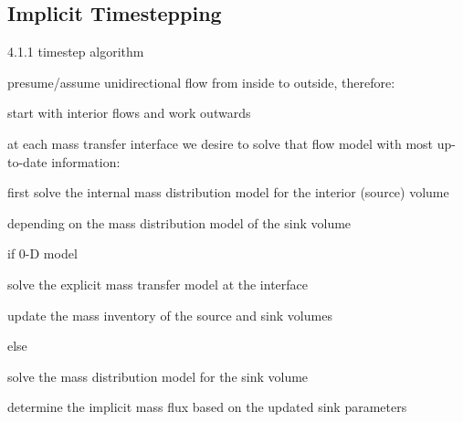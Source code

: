 \subsection{Implicit Timestepping}\label{sec:timestepping}

4.1.1 timestep algorithm

presume/assume unidirectional flow from inside to outside, therefore:

start with interior flows and work outwards

at each mass transfer interface we desire to solve that flow model with most up-to-date information:

first solve the internal mass distribution model for the interior (source) volume

depending on the mass distribution model of the sink volume

if 0-D model

solve the explicit mass transfer model at the interface

update the mass inventory of the source and sink volumes


else

solve the mass distribution model for the sink volume

determine the implicit mass flux based on the updated sink parameters

